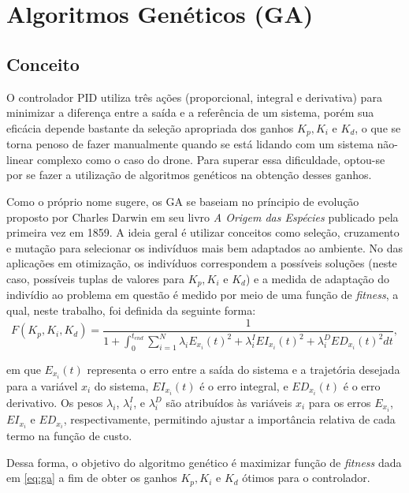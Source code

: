\section{Algoritmos Genéticos (GA)}

\subsection{Conceito}
O controlador PID utiliza três ações (proporcional, integral e derivativa) para minimizar a 
diferença entre a saída e a referência de um sistema, porém sua eficácia depende bastante da 
seleção apropriada dos ganhos $K_p, K_i \text{ e } K_d$, o que se torna penoso de fazer manualmente quando 
se está lidando com um sistema não-linear complexo como o caso do drone. Para superar essa 
dificuldade, optou-se por se fazer a utilização de algoritmos genéticos na obtenção desses 
ganhos.

Como o próprio nome sugere, os GA se baseiam no príncipio de evolução proposto por Charles Darwin 
em seu livro \textit{A Origem das Espécies} publicado pela primeira vez em 1859. A ideia geral é utilizar 
conceitos como seleção, cruzamento e mutação para selecionar os indivíduos mais bem adaptados ao ambiente. 
No das aplicações em otimização, os indivíduos correspondem a possíveis soluções (neste caso, 
possíveis tuplas de valores para $K_p, K_i \text{ e } K_d$) e a medida de adaptação do indivídio ao problema 
em questão é medido por meio de uma função de \textit{fitness}, a qual, neste trabalho, foi definida 
da seguinte forma:
\begin{equation}
    F(K_p, K_i, K_d) = \frac{1}{1+ \int_{0}^{t_{end}} \sum_{i=1}^{N} \lambda_{i}E_{x_i}(t)^2 + \lambda_i^IEI_{x_i}(t)^2 + \lambda_i^DED_{x_i}(t)^2  dt},
    \label{eq:ga}
\end{equation}

\noindent em que $E_{x_i}(t)$ representa o erro entre a saída do sistema e a trajetória desejada 
para a variável $x_i$ do sistema, $EI_{x_i}(t)$ é o erro integral, e $ED_{x_i}(t)$ é o erro derivativo. 
Os pesos $\lambda_i$, $\lambda_i^I$, e $\lambda_i^D$ são atribuídos às variáveis $x_i$ para os erros 
$E_{x_i}$, $EI_{x_i}$ e $ED_{x_i}$, respectivamente, permitindo ajustar a importância relativa de 
cada termo na função de custo.

Dessa forma, o objetivo do algoritmo genético é maximizar função de \textit{fitness} dada em \ref{eq:ga} 
a fim de obter os ganhos $K_p, K_i \text{ e } K_d$ ótimos para o controlador.

